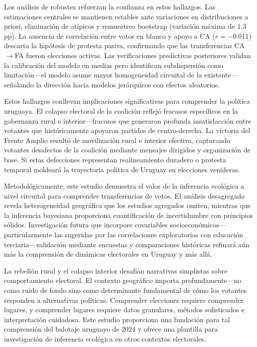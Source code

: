 Los análisis de robustez refuerzan la confianza en estos hallazgos. Las estimaciones centrales se mantienen estables ante variaciones en distribuciones a priori, eliminación de atípicos y remuestreo bootstrap (variación máxima de 1.3 pp). La ausencia de correlación entre votos en blanco y apoyo a CA ($r = -0.011$) descarta la hipótesis de protesta pasiva, confirmando que las transferencias CA$\to$FA fueron elecciones activas. Las verificaciones predictivas posteriores validan la calibración del modelo en medias pero identifican subdispersión como limitación---el modelo asume mayor homogeneidad circuital de la existente---señalando la dirección hacia modelos jerárquicos con efectos aleatorios.

Estos hallazgos conllevan implicaciones significativas para comprender la política uruguaya. El colapso electoral de la coalición reflejó fracasos específicos en la gobernanza rural e interior---fracasos que generaron profunda insatisfacción entre votantes que históricamente apoyaron partidos de centro-derecha. La victoria del Frente Amplio resultó de movilización rural e interior efectiva, capturando votantes desafectos de la coalición mediante mensajes dirigidos y organización de base. Si estas defecciones representan realineamiento duradero o protesta temporal moldeará la trayectoria política de Uruguay en elecciones venideras.

Metodológicamente, este estudio demuestra el valor de la inferencia ecológica a nivel circuital para comprender transferencias de votos. El análisis desagregado revela heterogeneidad geográfica que los estudios agregados omiten, mientras que la inferencia bayesiana proporciona cuantificación de incertidumbre con principios sólidos. Investigación futura que incorpore covariables socioeconómicas---particularmente las sugeridas por las correlaciones exploratorias con educación terciaria---validación mediante encuestas y comparaciones históricas refinará aún más la comprensión de dinámicas electorales en Uruguay y más allá.

La rebelión rural y el colapso interior desafían narrativas simplistas sobre comportamiento electoral. El contexto geográfico importa profundamente---no como ruido de fondo sino como determinante fundamental de cómo los votantes responden a alternativas políticas. Comprender elecciones requiere comprender lugares, y comprender lugares requiere datos granulares, métodos sofisticados e interpretación cuidadosa. Este estudio proporciona una fundación para tal comprensión del balotaje uruguayo de 2024 y ofrece una plantilla para investigación de inferencia ecológica en otros contextos electorales.

